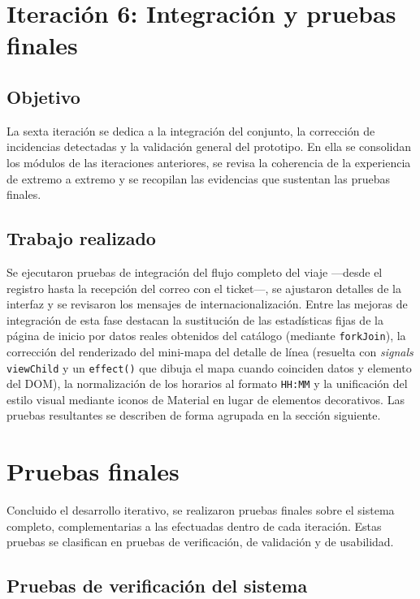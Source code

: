 \section{Iteración 6: Integración y pruebas finales}
\label{sec:iteracion-6}

\subsection{Objetivo}

La sexta iteración se dedica a la integración del conjunto, la corrección de incidencias detectadas y la validación general del prototipo. En ella se consolidan los módulos de las iteraciones anteriores, se revisa la coherencia de la experiencia de extremo a extremo y se recopilan las evidencias que sustentan las pruebas finales.

\subsection{Trabajo realizado}

Se ejecutaron pruebas de integración del flujo completo del viaje —desde el registro hasta la recepción del correo con el ticket—, se ajustaron detalles de la interfaz y se revisaron los mensajes de internacionalización. Entre las mejoras de integración de esta fase destacan la sustitución de las estadísticas fijas de la página de inicio por datos reales obtenidos del catálogo (mediante \texttt{forkJoin}), la corrección del renderizado del mini-mapa del detalle de línea (resuelta con \textit{signals} \texttt{viewChild} y un \texttt{effect()} que dibuja el mapa cuando coinciden datos y elemento del DOM), la normalización de los horarios al formato \texttt{HH:MM} y la unificación del estilo visual mediante iconos de Material en lugar de elementos decorativos. Las pruebas resultantes se describen de forma agrupada en la sección siguiente.


\section{Pruebas finales}
\label{sec:pruebas-finales}

Concluido el desarrollo iterativo, se realizaron pruebas finales sobre el sistema completo, complementarias a las efectuadas dentro de cada iteración. Estas pruebas se clasifican en pruebas de verificación, de validación y de usabilidad.


\subsection{Pruebas de verificación del sistema}

